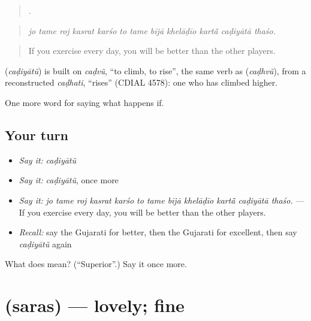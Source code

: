 \begin{quote}
           .
\end{quote}

\begin{quote}
\emph{jo tame roj kasrat karśo to tame bījā khelāḍīo kartā̃ caḍiyātā thaśo.}
\end{quote}

\begin{quote}
If you exercise every day, you will be better than the other players.
\end{quote}

\begin{cousinweb}
\textbf{} (\emph{caḍiyātũ}) is built on \emph{caḍvũ}, \textquotedblleft{}to climb, to rise\textquotedblright{}, the same verb as \textbf{} (\emph{caḍhvũ}), from a reconstructed \emph{caḍhati}, \textquotedblleft{}rises\textquotedblright{} (CDIAL 4578): one who has climbed higher.
\end{cousinweb}

\begin{grammarlens}[title={What you've built}]
One more word for saying what happens if.
\end{grammarlens}

\subsection*{Your turn}
\begin{itemize}
\raggedright
  \item \emph{Say it:} \emph{caḍiyātũ}
  \item \emph{Say it:} \emph{caḍiyātũ}, once more
  \item \emph{Say it:} \emph{jo tame roj kasrat karśo to tame bījā khelāḍīo kartā̃ caḍiyātā thaśo.} — If you exercise every day, you will be better than the other players.
  \item \emph{Recall:} say the Gujarati for better, then the Gujarati for excellent, then say \emph{caḍiyātũ} again
\end{itemize}

\begin{tcolorbox}[breakable,colback=teal!4,colframe=teal!35!black,title={Before you move on}]
What does  mean? (\textquotedblleft{}Superior\textquotedblright{}.) Say it once more.
\end{tcolorbox}
\section[\texorpdfstring{\gu{સરસ} (saras)}{સરસ (saras)}]{ (saras) — lovely; fine}

